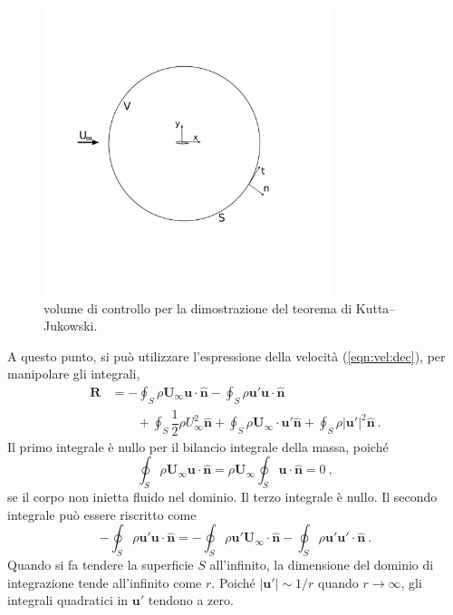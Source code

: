 \begin{figure}[h!]
\centering
 \includegraphics[width=0.75\textwidth, trim= 40 100 100 100, clip]{./fig/kj}
\caption{volume di controllo per la dimostrazione del teorema di Kutta--Jukowski.}\label{fig:kj}
\end{figure}

A questo punto, si può utilizzare l'espressione della velocità (\ref{eqn:vel:dec}), per manipolare gli integrali,
\begin{equation}\label{eqn:kj:1}
\begin{aligned}
 \bm{R} & = - \oint_S \rho \bm{U}_{\infty} \bm{u} \cdot \bm{\hat{n}}
            - \oint_S \rho \bm{u}'         \bm{u} \cdot \bm{\hat{n}} \\
   & \qquad + \oint_S \dfrac{1}{2} \rho U^2_{\infty}  \bm{\hat{n}}
            + \oint_S \rho \bm{U}_{\infty} \cdot \bm{u}' \bm{\hat{n}}
            + \oint_S \rho |\bm{u}'|^2 \bm{\hat{n}} \ .
\end{aligned}
\end{equation}
Il primo integrale è nullo per il bilancio integrale della massa, poiché
\begin{equation}
  \oint_S \rho \bm{U}_{\infty} \bm{u} \cdot \bm{\hat{n}} = 
  \rho \bm{U}_{\infty} \oint_S \bm{u} \cdot \bm{\hat{n}} = 0 \ ,
\end{equation}
se il corpo non inietta fluido nel dominio. Il terzo integrale è nullo.
Il secondo integrale può essere riscritto come
\begin{equation}
- \oint_S \rho \bm{u}'         \bm{u} \cdot \bm{\hat{n}} = 
- \oint_S \rho \bm{u}' \bm{U}_{\infty}\cdot \bm{\hat{n}} 
- \oint_S \rho \bm{u}' \bm{u}'        \cdot \bm{\hat{n}} \ .
\end{equation}
Quando si fa tendere la superficie $S$ all'infinito, la dimensione del dominio di integrazione tende all'infinito come $r$. Poiché $|\bm{u}'| \sim 1/r$ quando $r \rightarrow \infty$, gli integrali quadratici in $\bm{u}'$ tendono a zero.

